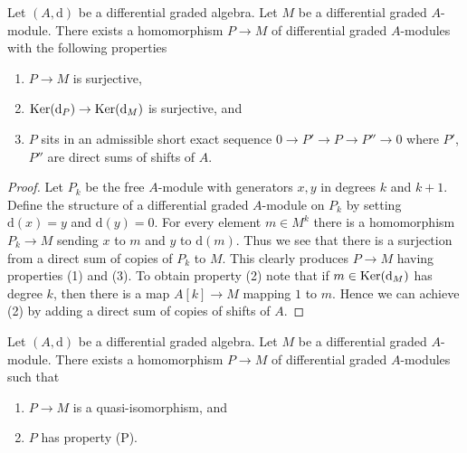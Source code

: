 \begin{lemma}
\label{lemma-good-quotient}
Let $(A, \text{d})$ be a differential graded algebra.
Let $M$ be a differential graded $A$-module. There exists a homomorphism
$P \to M$ of differential graded $A$-modules with the following
properties
\begin{enumerate}
\item $P \to M$ is surjective,
\item $\mathop{\mathrm{Ker}}(\text{d}_P) \to \mathop{\mathrm{Ker}}(\text{d}_M)$ is surjective, and
\item $P$ sits in an admissible short exact sequence
$0 \to P' \to P \to P'' \to 0$ where $P'$, $P''$ are direct sums
of shifts of $A$.
\end{enumerate}
\end{lemma}

\begin{proof}
Let $P_k$ be the free $A$-module with generators $x, y$ in degrees
$k$ and $k + 1$. Define the structure of a differential graded
$A$-module on $P_k$ by setting $\text{d}(x) = y$ and $\text{d}(y) = 0$.
For every element $m \in M^k$ there is a homomorphism
$P_k \to M$ sending $x$ to $m$ and $y$ to $\text{d}(m)$.
Thus we see that there is a surjection from a direct sum
of copies of $P_k$ to $M$. This clearly produces $P \to M$
having properties (1) and (3). To obtain property (2) note
that if $m \in \mathop{\mathrm{Ker}}(\text{d}_M)$ has degree $k$, then there is a map
$A[k] \to M$ mapping $1$ to $m$. Hence we can achieve (2) by adding
a direct sum of copies of shifts of $A$.
\end{proof}

\begin{lemma}
\label{lemma-resolve}
Let $(A, \text{d})$ be a differential graded algebra.
Let $M$ be a differential graded $A$-module. There exists a homomorphism
$P \to M$ of differential graded $A$-modules such that
\begin{enumerate}
\item $P \to M$ is a quasi-isomorphism, and
\item $P$ has property (P).
\end{enumerate}
\end{lemma}


